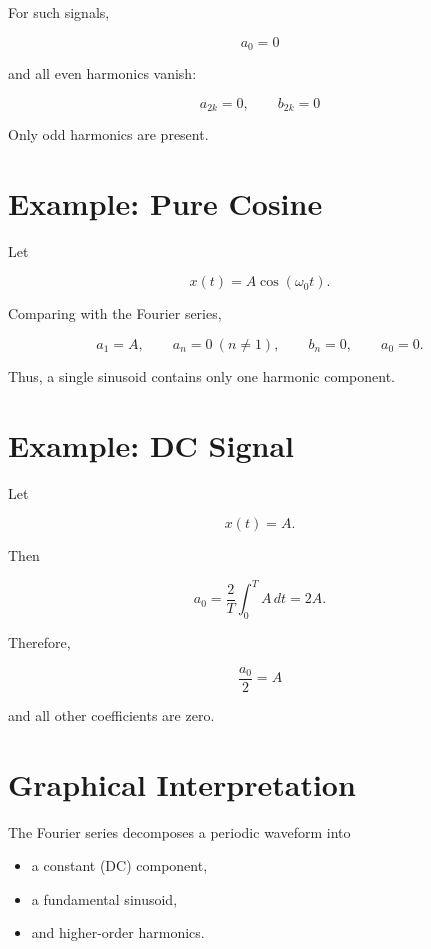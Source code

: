 For such signals,

\[
\boxed{
a_0=0
}
\]

and all even harmonics vanish:

\[
\boxed{
a_{2k}=0,\qquad b_{2k}=0
}
\]

Only odd harmonics are present.


\section{Example: Pure Cosine}

Let

\[
x(t)=A\cos(\omega_0 t).
\]

Comparing with the Fourier series,

\[
a_1=A,
\qquad
a_n=0\ (n\neq1),
\qquad
b_n=0,
\qquad
a_0=0.
\]

Thus, a single sinusoid contains only one harmonic component.


\section{Example: DC Signal}

Let

\[
x(t)=A.
\]

Then

\[
a_0=
\frac{2}{T}\int_0^T A\,dt
=
2A.
\]

Therefore,

\[
\frac{a_0}{2}=A
\]

and all other coefficients are zero.


\section{Graphical Interpretation}

The Fourier series decomposes a periodic waveform into

\begin{itemize}
\item a constant (DC) component,
\item a fundamental sinusoid,
\item and higher-order harmonics.
\end{itemize}

